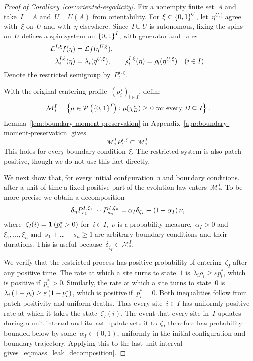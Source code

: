 \begin{proof}[Proof of Corollary~\ref{cor:oriented-ergodicity}]
    

Fix a nonempty finite set~$A$ and take~$I=\bar A$ and~$U=U(A)$ from
orientability. For~$\xi\in\left\{0,1\right\}^U$, let~$\eta^{U,\xi}$ agree with~$\xi$
on~$U$ and with~$\eta$ elsewhere. Since~$I\cup U$ is autonomous, fixing
the spins on~$U$ defines a spin system on~$\left\{0,1\right\}^I$, with generator
and rates
\begin{align*}
\mathcal{L}^{I,\xi}f(\eta)&=\mathcal{L} f(\eta^{U,\xi}),\\
\lambda_i^{I,\xi}(\eta)&=\lambda_i(\eta^{U,\xi}),
\qquad
\rho_i^{I,\xi}(\eta)=\rho_i(\eta^{U,\xi})
\quad(i\in I).
\end{align*}
Denote the restricted semigroup by~$P_t^{I,\xi}$.

With the original centering profile~$(p_i^\star)_{i\in I}$, define
\begin{equation*}
\mathcal M_*^I
=\left\{\mu\in\mathcal P\left(\left\{0,1\right\}^I\right):
       \mu(\chi_B^*)\geq0\text{ for every }B\subseteq I\right\}.
\end{equation*}
Lemma~\ref{lem:boundary-moment-preservation} in
Appendix~\ref{app:boundary-moment-preservation} gives
\begin{equation*}
\mathcal M_*^I P_t^{I,\xi}\subseteq\mathcal M_*^I.
\end{equation*}
This holds for every boundary condition~$\xi$. The restricted system is also patch positive, though we do not use this fact directly.

We next show that, for every initial configuration~$\eta$ and boundary conditions, after a unit of time a fixed positive part of the evolution law enters~$\mathcal{M}_*^I$. To be more precise we obtain a decomposition
\begin{equation}\label{eq:mass_leak_decomposition}
    \delta_\eta P_{s_1}^{I,\xi_1}\cdots P_{s_n}^{I,\xi_n} = \alpha_I \delta_{\zeta_I} + \left(1-\alpha_I\right)\nu,
\end{equation}
where~$\zeta_I(i) = \mathbf{1}\left(p_i^* > 0\right)$ for~$i\in I$,~$\nu$ is a probability measure,~$\alpha_I>0$ and~$\xi_1,\dots,\xi_n$ and~$s_1+\dots +s_n\geq 1$ are arbitrary boundary conditions and their durations. This is useful because~$\delta_{\zeta_I}\in\mathcal{M}_*^I$.

We verify that the restricted process has positive probability of entering~$\zeta_I$ after any positive time. The rate at which a site turns to state~$1$ is~$\lambda_i\rho_i  \geq \varepsilon p_i^*$, which is positive if~$p_i^*>0$. Similarly, the rate at which a site turns to state~$0$ is~$\lambda_i\left(1 - \rho_i\right)\geq \varepsilon \left(1-p_i^*\right)$, which is positive if~$p_i^* = 0$. Both inequalities follow from patch positivity and uniform deaths. Thus every site~$i\in I$ has uniformly positive rate at which it takes the state~$\zeta_I(i)$. The event that every site in~$I$ updates during a unit interval and its last update sets it to~$\zeta_I$ therefore has probability bounded below by some~$\alpha_I\in(0,1)$, uniformly in the initial configuration and boundary trajectory. Applying this to the last unit interval gives~\eqref{eq:mass_leak_decomposition}.


\end{proof}
